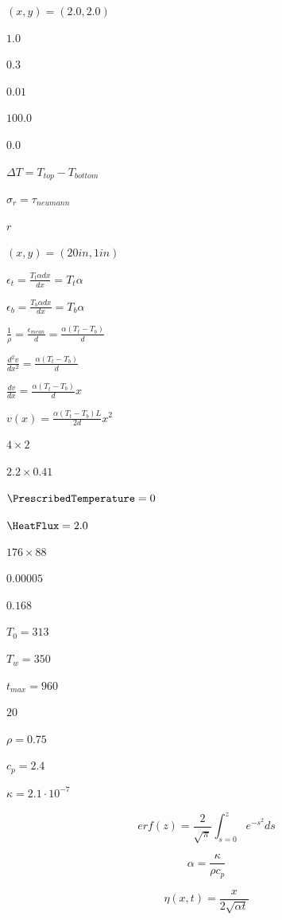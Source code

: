 \documentclass{article}
\begin{document}
$ (x, y) = ( 2.0, 2.0 ) $
\pagebreak

$ 1.0 $
\pagebreak

$ 0.3 $
\pagebreak

$ 0.01 $
\pagebreak

$ 100.0 $
\pagebreak

$ 0.0 $
\pagebreak

$ \Delta T = T_{top} - T_{bottom}  $
\pagebreak

$ \sigma_r = \tau_{neumann} $
\pagebreak

$ r $
\pagebreak

$ (x, y) = (20 in, 1 in) $
\pagebreak

$ \epsilon_t = \frac{ T_t \alpha dx }{ dx } = T_t \alpha $
\pagebreak

$ \epsilon_b = \frac{ T_b \alpha dx }{ dx } = T_b \alpha $
\pagebreak

$ \frac{ 1 }{ \rho } = \frac{ \epsilon_{mean} }{ d } = \frac{ \alpha (T_t - T_b) }{ d } $
\pagebreak

$ \frac{ d^2 v }{ dx^2 } = \frac{ \alpha (T_t - T_b) }{ d } $
\pagebreak

$ \frac{ dv }{ dx } = \frac{ \alpha (T_t - T_b) }{ d } x $
\pagebreak

$ v(x) = \frac{ \alpha (T_t - T_b) L }{ 2 d } x^2 $
\pagebreak

$ 4 \times 2$
\pagebreak

$ 2.2 \times 0.41 $
\pagebreak

$ \PrescribedTemperature = 0 $
\pagebreak

$ \HeatFlux = 2.0 $
\pagebreak

$ 176 \times 88 $
\pagebreak

$ 0.00005 $
\pagebreak

$ 0.168 $
\pagebreak

$ T_0 = 313 $
\pagebreak

$ T_{w} = 350 $
\pagebreak

$ t_{max} = 960 $
\pagebreak

$ 20 $
\pagebreak

$ \rho = 0.75 $
\pagebreak

$ c_p = 2.4 $
\pagebreak

$ \kappa = 2.1 \cdot 10^{-7} $
\pagebreak

\[
erf(z) = \frac{2}{\sqrt{\pi}} \int_{s=0}^z e^{-s^2} ds
\]
\pagebreak

\[
\alpha = \frac{\kappa}{\rho c_p}
\]
\pagebreak

\[
\eta(x,t) = \frac{x}{2 \sqrt{\alpha t}}
\]
\pagebreak
\end{document}
